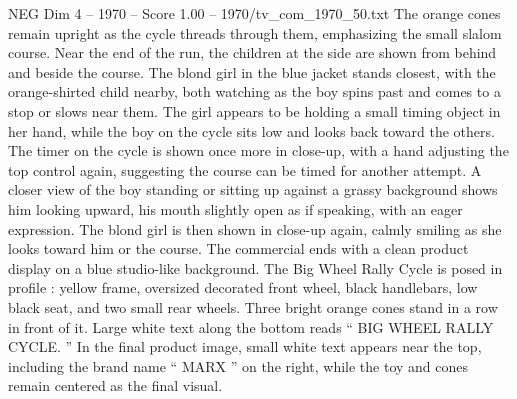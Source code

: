 \begin{textsample}{NEG Dim 4 – 1970 – Score 1.00 – 1970/tv\_com\_1970\_50.txt}
The orange cones remain upright as the cycle threads through them, emphasizing the small slalom course.
Near the end of the run, the children at the side are shown from behind and beside the course.
The blond girl in the blue jacket stands closest, with the orange-shirted child nearby, both watching as the boy spins past and comes to a stop or slows near them.
The girl appears to be holding a small timing object in her hand, while the boy on the cycle sits low and looks back toward the others.
The timer on the cycle is shown once more in close-up, with a hand adjusting the top control again, suggesting the course can be timed for another attempt.
A closer view of the boy standing or sitting up against a grassy background shows him looking upward, his mouth slightly open as if speaking, with an eager expression.
The blond girl is then shown in close-up again, calmly smiling as she looks toward him or the course.
The commercial ends with a clean product display on a blue studio-like background.
The Big Wheel Rally Cycle is posed in profile : yellow frame, oversized decorated front wheel, black handlebars, low black seat, and two small rear wheels.
Three bright orange cones stand in a row in front of it.
Large white text along the bottom reads “ BIG WHEEL RALLY CYCLE. ” In the final product image, small white text appears near the top, including the brand name “ MARX ” on the right, while the toy and cones remain centered as the final visual.

\end{textsample}
